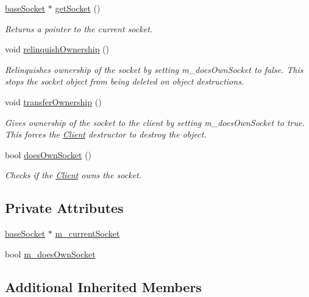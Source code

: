 \begin{DoxyCompactItemize}
\hyperlink{class_communication_1_1base_socket}{base\+Socket} $\ast$ \hyperlink{class_communication_1_1_client_a87a0efa909c795c7680512bd0c35c883}{get\+Socket} ()
\begin{DoxyCompactList}\small\item\em Returns a pointer to the current socket. \end{DoxyCompactList}\item 
void \hyperlink{class_communication_1_1_client_a5ac457cde6469d51fc9a9424bf673206}{relinquish\+Ownership} ()
\begin{DoxyCompactList}\small\item\em Relinquishes ownership of the socket by setting m\+\_\+does\+Own\+Socket to false. This stops the socket object from being deleted on object destructions. \end{DoxyCompactList}\item 
void \hyperlink{class_communication_1_1_client_a6c33c673b779dc2443f66ed453178f43}{transfer\+Ownership} ()
\begin{DoxyCompactList}\small\item\em Gives ownership of the socket to the client by setting m\+\_\+does\+Own\+Socket to true. This forces the \hyperlink{class_communication_1_1_client}{Client} destructor to destroy the object. \end{DoxyCompactList}\item 
bool \hyperlink{class_communication_1_1_client_a7a6d48c9528ed8c4d4175dfcdd4ddf87}{does\+Own\+Socket} ()
\begin{DoxyCompactList}\small\item\em Checks if the \hyperlink{class_communication_1_1_client}{Client} owns the socket. \end{DoxyCompactList}\end{DoxyCompactItemize}
\subsection*{Private Attributes}
\begin{DoxyCompactItemize}
\item 
\hyperlink{class_communication_1_1base_socket}{base\+Socket} $\ast$ \hyperlink{class_communication_1_1_client_a2795556f3ffbb25b8c3f242b4d643c25}{m\+\_\+current\+Socket}
\item 
bool \hyperlink{class_communication_1_1_client_afe0f1b2c58ad4ec8a0b2fb74e3a59b08}{m\+\_\+does\+Own\+Socket}
\end{DoxyCompactItemize}
\subsection*{Additional Inherited Members}


